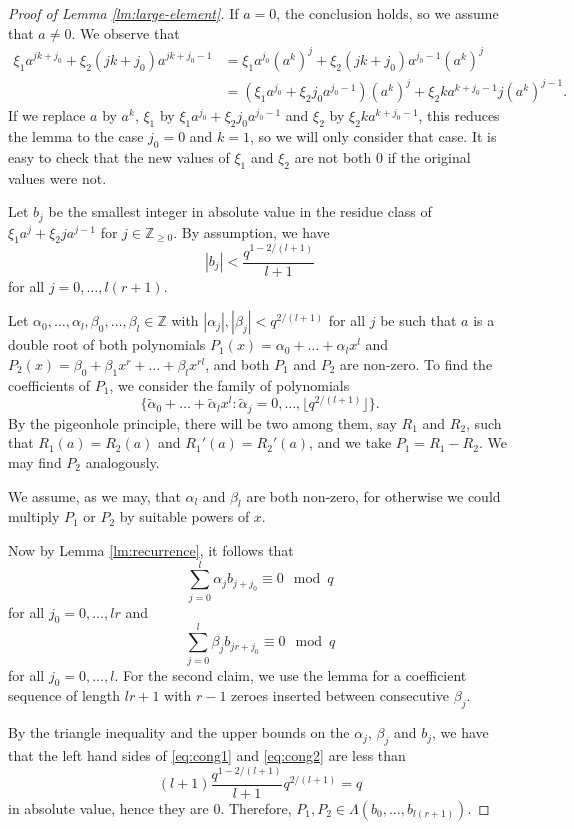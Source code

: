 \documentclass[12pt, notitlepage]{amsart}
\numberwithin{equation}{section}
\def\Z{\mathbb Z}
\def\wt{\widetilde}
\theoremstyle{remark}
\theoremstyle{definition}
\theoremstyle{remark}
\numberwithin{equation}{section}
\renewcommand{\a}{\alpha}
\renewcommand{\b}{\beta}
\begin{document}
\begin{proof}[Proof of Lemma \ref{lm:large-element}]
If $a=0$, the conclusion holds, so we assume that $a\neq 0$.
We observe that
\begin{align*}
\xi_1 a^{jk+j_0}+\xi_2(jk+j_0)a^{jk+j_0-1}
&= \xi_1a^{j_0}(a^k)^j+\xi_2(jk+j_0)a^{j_0-1}(a^k)^{j}\\
&=(\xi_1 a^{j_0}+\xi_2 j_0 a^{j_0-1})(a^k)^j
+\xi_2k a^{k+j_0-1}j(a^k)^{j-1}.
\end{align*}
If we replace $a$ by $a^k$, $\xi_1$ by $\xi_1 a^{j_0}+\xi_2 j_0 a^{j_0-1}$
and $\xi_2$ by $\xi_2k a^{k+j_0-1}$,
this reduces the lemma to the case $j_0=0$ and $k=1$, so we will only consider that case.
It is easy to check that the new values of $\xi_1$ and $\xi_2$ are
not both $0$ if the original values were not.

Let $b_j$ be the smallest integer in absolute value  in the residue
class of $\xi_1a^j+\xi_2ja^{j-1}$ for $j\in\Z_{\ge 0}$.
By assumption, we have
\[|b_j|<\frac{q^{1-2/(l+1)}}{l+1}\]
for all $j=0,\ldots, l(r+1)$.

Let $\a_0,\ldots,\a_l, \b_0,\ldots,\b_l\in\Z$
with $|\a_j|,|\b_j|<q^{2/(l+1)}$ for all $j$ be
such that
$a$ is a double root of both polynomials
$P_1(x)=\a_0+\ldots+\a_l x^l$ and $P_2(x)=\b_0+\b_1 x^r+\ldots+\b_l x^{rl}$,
and both $P_1$ and $P_2$ are non-zero.
To find the coefficients of $P_1$, we consider the family of polynomials
\[
\{\wt\a_0+\ldots+\wt \a_l x^l:\wt \a_j=0,\ldots,\lfloor q^{2/(l+1)}\rfloor\}.
\]
By the pigeonhole principle, there will be two among them, say $R_1$ and $R_2$,
such that $R_1(a)=R_2(a)$ and $R_1'(a)=R_2'(a)$, and we take $P_1=R_1-R_2$.
We may find $P_2$ analogously.

We assume, as we may, that $\a_l$ and $\b_l$ are both non-zero, for otherwise we
could multiply $P_1$ or $P_2$ by suitable powers of $x$.

Now by Lemma \ref{lm:recurrence}, it follows that
\begin{equation}\label{eq:cong1}
\sum_{j=0}^{l}\a_j b_{j+j_0}\equiv 0\mod q
\end{equation}
for all $j_0=0,\ldots, lr$
and
\begin{equation}\label{eq:cong2}
\sum_{j=0}^{l}\b_j b_{jr+j_0}\equiv 0\mod q
\end{equation}
for all $j_0=0,\ldots,l$.
For the second claim, we use the lemma for a coefficient sequence of length
$lr+1$ with $r-1$ zeroes inserted between consecutive $\beta_j$.

By the triangle inequality and the upper bounds on the $\a_j$, $\b_j$ and $b_j$, we
have that the left hand sides of \eqref{eq:cong1} and \eqref{eq:cong2}
are less than
\[
(l+1)\frac{q^{1-2/(l+1)}}{l+1}q^{2/(l+1)}=q
\]
in absolute value, hence they are $0$.
Therefore, $P_1,P_2\in \Lambda(b_0,\ldots,b_{l(r+1)})$.


\end{proof}
\end{document}
